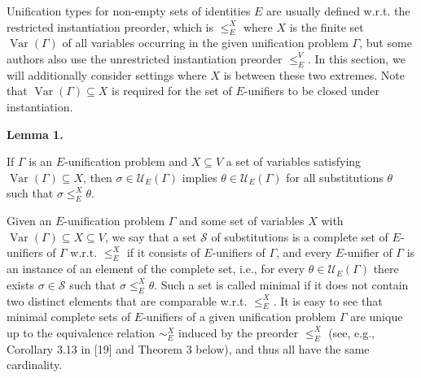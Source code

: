 \documentclass[10pt,a4paper]{amsart}
\begin{document}
 
 
Unification types for non-empty sets of identities $E$ are usually defined w.r.t. the restricted instantiation preorder, which is $\leq_{E}^{X}$ where $X$ is the finite set $\operatorname{Var}(\Gamma)$ of all variables occurring in the given unification problem $\Gamma$, but some authors also use the unrestricted instantiation preorder $\leq_{E}^{V}$. In this section, we will additionally consider settings where $X$ is between these two extremes. Note that $\operatorname{Var}(\Gamma)\subseteq X$ is required for the set of $E$-unifiers to be closed under instantiation.\par
 
 
 
\par\medskip\noindent\textbf{Lemma 1.}\par
 
 
If $\Gamma$ is an $E$-unification problem and $X\subseteq V$ a set of variables satisfying $\operatorname{Var}(\Gamma)\subseteq X$, then $\sigma\in\mathcal{U}_{E}(\Gamma)$ implies $\theta\in\mathcal{U}_{E}(\Gamma)$ for all substitutions $\theta$ such that $\sigma\leq_{E}^{X}\theta$.\par
 
 
 
 
Given an $E$-unification problem $\Gamma$ and some set of variables $X$ with $\operatorname{Var}(\Gamma)\subseteq X\subseteq V$, we say that a set $\mathcal{S}$ of substitutions is a complete set of $E$-unifiers of $\Gamma$ w.r.t. $\leq_{E}^{X}$ if it consists of $E$-unifiers of $\Gamma$, and every $E$-unifier of $\Gamma$ is an instance of an element of the complete set, i.e., for every $\theta\in\mathcal{U}_{E}(\Gamma)$ there exists $\sigma\in\mathcal{S}$ such that $\sigma\leq_{E}^{X}\theta$. Such a set is called minimal if it does not contain two distinct elements that are comparable w.r.t. $\leq_{E}^{X}$. It is easy to see that minimal complete sets of $E$-unifiers of a given unification problem $\Gamma$ are unique up to the equivalence relation $\sim_{E}^{X}$ induced by the preorder $\leq_{E}^{X}$ (see, e.g., Corollary 3.13 in [19] and Theorem 3 below), and thus all have the same cardinality.\par
 
\end{document}
